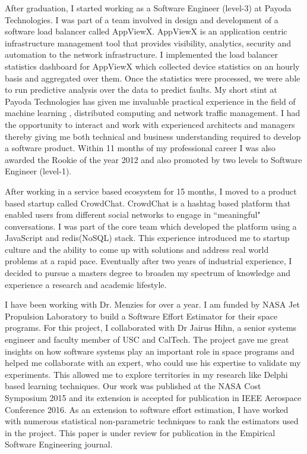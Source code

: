 \documentclass{article}
\begin{document}
\bigskip

After graduation, I started working as a Software Engineer (level-3) at Payoda Technologies. I was part of a team involved in design and development of a software load balancer called AppViewX. AppViewX is an application centric infrastructure management tool that provides visibility, analytics, security and automation to the network infrastructure. I implemented the load balancer statistics dashboard for AppViewX which collected device statistics on an hourly basis and aggregated over them. Once the statistics were processed, we were able to run predictive analysis over the data to predict faults. My short stint at Payoda Technologies has given me invaluable practical experience in the field of machine learning , 
distributed computing and network traffic management. I had the opportunity to interact and 
work with experienced architects and managers thereby giving me both technical and business
understanding required to develop a software product. Within 11 months of my professional career I was also awarded the Rookie of the year 2012 and also promoted by two levels to Software Engineer (level-1). 

\bigskip
After working in a service based ecosystem for 15 months, I moved to a product based startup called CrowdChat. CrowdChat is a hashtag based platform that enabled users from different social networks to engage in ``meaningful" conversations. I was part of the  core team which developed the platform using a JavaScript and redis(NoSQL) stack. This experience introduced me to startup culture and the ability to come up with solutions and address real world problems at a rapid pace. Eventually after two years of industrial experience, I decided to pursue a masters degree to broaden my spectrum of knowledge and experience a research and academic lifestyle.


\bigskip
I have been working with Dr. Menzies for over a year. I am funded by NASA Jet Propulsion Laboratory to build a Software Effort Estimator for their space programs. For this project, I collaborated with Dr Jairus Hihn, a senior systems engineer and faculty member of USC and CalTech. The project gave me great insights on how software systems play an important role in space programs and helped me collaborate with an expert, who could use his expertise to validate my experiments. This allowed me to explore territories in my research like Delphi based learning techniques. Our work was published at the NASA Cost Symposium 2015 and its extension is accepted for publication in IEEE Aerospace Conference 2016. As an extension to software effort estimation, I have worked with numerous statistical non-parametric techniques to rank the estimators used in the project. This paper is under review for publication in the Empirical Software Engineering journal.
\end{document}

